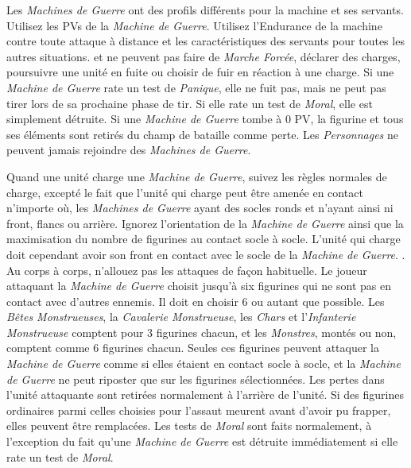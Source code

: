 Les \emph{Machines de Guerre} ont des profils différents pour la machine et ses servants. Utilisez les PVs de la \emph{Machine de Guerre}. Utilisez  l'Endurance de la machine contre toute attaque à distance et les caractéristiques des servants pour toutes les autres situations.  et ne peuvent pas faire de \emph{Marche Forcée}, déclarer des charges, poursuivre une unité en fuite ou choisir de fuir en réaction à une charge. Si une \emph{Machine de Guerre} rate un test de \emph{Panique}, elle ne fuit pas, mais ne peut pas tirer lors de sa prochaine phase de tir. Si elle rate un test de \emph{Moral}, elle est simplement détruite. Si une \emph{Machine de Guerre} tombe à 0 PV, la figurine et tous ses éléments sont retirés du champ de bataille comme perte. Les \emph{Personnages} ne peuvent jamais rejoindre des \emph{Machines de Guerre}.

Quand une unité charge une \emph{Machine de Guerre}, suivez les règles normales de charge, excepté le fait que l'unité qui charge peut être amenée en contact n'importe où, les \emph{Machines de Guerre} ayant des socles ronds et n'ayant ainsi ni front, flancs ou arrière. Ignorez l'orientation de la \emph{Machine de Guerre} ainsi que la maximisation du nombre de figurines au contact socle à socle. L'unité qui charge doit cependant avoir son front en contact avec le socle de la \emph{Machine de Guerre}. . Au corps à corps, n'allouez pas les attaques de façon habituelle. Le joueur attaquant la \emph{Machine de Guerre} choisit jusqu'à six figurines qui ne sont pas en contact avec d'autres ennemis. Il doit en choisir 6 ou autant que possible. Les \emph{Bêtes Monstrueuses}, la \emph{Cavalerie Monstrueuse}, les \emph{Chars} et l'\emph{Infanterie Monstrueuse} comptent pour 3 figurines chacun, et les \emph{Monstres}, montés ou non, comptent comme 6 figurines chacun. Seules ces figurines peuvent attaquer la \emph{Machine de Guerre} comme si elles étaient en contact socle à socle, et la \emph{Machine de Guerre} ne peut riposter que sur les figurines sélectionnées. Les pertes dans l'unité attaquante sont retirées normalement à l'arrière de l'unité. Si des figurines ordinaires parmi celles choisies pour l'assaut meurent avant d'avoir pu frapper, elles peuvent être remplacées. Les tests de \emph{Moral} sont faits normalement, à l'exception du fait qu'une \emph{Machine de Guerre} est détruite immédiatement si elle rate un test de \emph{Moral}.

